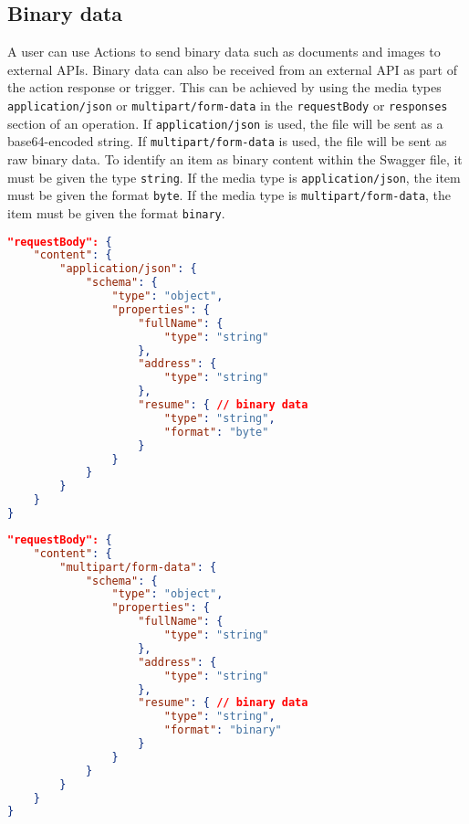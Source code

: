 \subsection{Binary data}
A user can use Actions to send binary data such as documents and images to external APIs. Binary data can also be received from an external API as part of the action response or trigger. This can be achieved by using the media types \texttt{application/json} or \texttt{multipart/form-data} in the \texttt{requestBody} or \texttt{responses} section of an operation. If \texttt{application/json} is used, the file will be sent as a base64-encoded string. If \texttt{multipart/form-data} is used, the file will be sent as raw binary data. To identify an item as binary content within the Swagger file, it must be given the type \texttt{string}. If the media type is \texttt{application/json}, the item must be given the format \texttt{byte}. If the media type is \texttt{multipart/form-data}, the item must be given the format \texttt{binary}.
\begin{lstlisting}[caption={Defining files in JSON data},label={code:binaryinjson},language=json]
"requestBody": {
    "content": {
        "application/json": {
            "schema": {
                "type": "object",
                "properties": {
                    "fullName": {
                        "type": "string"
                    },
                    "address": {
                        "type": "string"
                    },
                    "resume": { // binary data
                        "type": "string",
                        "format": "byte"
                    }
                }
            }
        }
    }
}
\end{lstlisting}
\begin{lstlisting}[caption={Defining files in a form post},label={code:binaryinmultipart},language=json]
"requestBody": {
    "content": {
        "multipart/form-data": {
            "schema": {
                "type": "object",
                "properties": {
                    "fullName": {
                        "type": "string"
                    },
                    "address": {
                        "type": "string"
                    },
                    "resume": { // binary data
                        "type": "string",
                        "format": "binary"
                    }
                }
            }
        }
    }
}
\end{lstlisting}